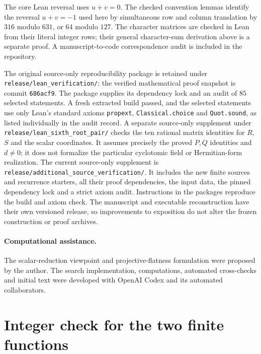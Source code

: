 \documentclass[10pt]{article}
\begin{document}
The core Lean reversal uses $u+v=0$. The checked convention lemmas
identify the reversal $u+v=-1$ used here by simultaneous row and column
translation by $316$ modulo $631$, or $64$ modulo $127$.
The character matrices are checked in Lean from their literal integer
rows; their general character-sum derivation above is a separate proof.
A manuscript-to-code correspondence audit is included in the repository.

The original source-only reproducibility package is retained under
\texttt{release/lean\_verification/}; the verified mathematical proof
snapshot is commit \texttt{686acf9}. The package supplies its dependency
lock and an audit of $85$ selected statements. A fresh extracted build
passed, and the selected statements use only Lean's standard axioms
\texttt{propext}, \texttt{Classical.choice} and \texttt{Quot.sound},
as listed individually in the audit record. A separate source-only
supplement under \texttt{release/lean\_sixth\_root\_pair/} checks the ten
rational matrix identities for $R$, $S$ and the scalar coordinates.
It assumes precisely the proved $P,Q$ identities and $d\ne0$; it does not
formalize the particular cyclotomic field or Hermitian-form realization.
The current source-only supplement is
\texttt{release/additional\_source\_verification/}. It includes the new
finite sources and recurrence starters, all their proof dependencies,
the input data, the pinned dependency lock and a strict axiom audit.
Instructions in the packages reproduce the build and axiom check. The manuscript and executable
reconstruction have their own versioned release, so improvements to
exposition do not alter the frozen construction or proof archives.

\paragraph{Computational assistance.}
The scalar-reduction viewpoint and projective-flatness formulation were
proposed by the author. The search implementation, computations, automated
cross-checks and initial text were developed with OpenAI Codex and its
automated collaborators.


\appendix
\section{Integer check for the two finite functions}\label{app:integer}
\end{document}
